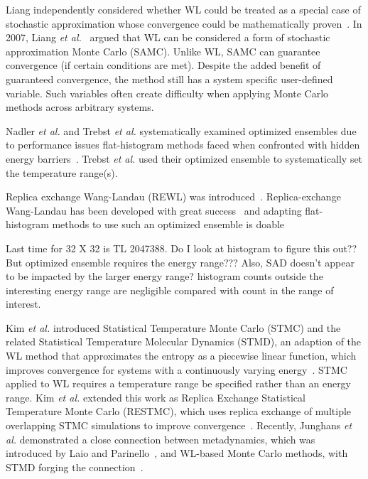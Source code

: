 Liang independently considered whether WL could be treated as a special case of
stochastic approximation whose convergence could be mathematically
proven~\cite{liang2006theory, liang2007stochastic}. In 2007, Liang \emph{et
al.}~\cite{liang2007stochastic} argued that WL can be considered a form of
stochastic approximation Monte Carlo (SAMC). Unlike WL, SAMC can guarantee
convergence (if certain conditions are met). Despite the added benefit of
guaranteed convergence, the method still has a system specific user-defined
variable. Such variables often create difficulty when applying Monte Carlo
methods across arbitrary systems.

Nadler \emph{et al.} and Trebst \emph{et al.} systematically examined optimized
ensembles due to performance issues flat-histogram methods faced when
confronted with hidden energy barriers~\cite{nadler2007generalized,
nadler2007dynamics, trebst2004optimizing}. Trebst \emph{et al.} used their
optimized ensemble to systematically set the temperature range(s).

Replica exchange Wang-Landau (REWL) was introduced~\cite{vogel2013rewl}.
Replica-exchange Wang-Landau has been developed with great
success~\cite{perera2016magnetic} and adapting flat-histogram methods to use
such an optimized ensemble is doable

Last time for 32 X 32 is TL 2047388. Do I look at histogram to figure this out??
But optimized ensemble requires the energy range???
Also, SAD doesn't appear to be impacted by the larger energy range? histogram counts outside the interesting energy range are negligible compared with count in the range of interest.

Kim \emph{et al.} introduced Statistical Temperature Monte Carlo (STMC) and the
related Statistical Temperature Molecular Dynamics (STMD), an adaption of the
WL method that approximates the entropy as a piecewise linear function, which
improves convergence for systems with a continuously varying
energy~\cite{kim2006statistical, kim2007statistical}. STMC applied to WL
requires a temperature range be specified rather than an energy range. Kim
\emph{et al.} extended this work as Replica Exchange Statistical Temperature
Monte Carlo (RESTMC), which uses replica exchange of multiple overlapping STMC
simulations to improve convergence~\cite{kim2009replica}. Recently, Junghans
\emph{et al.} demonstrated a close connection between metadynamics, which was
introduced by Laio and Parinello~\cite{laio2002escaping}, and WL-based Monte
Carlo methods, with STMD forging the connection~\cite{junghans2014molecular}.

